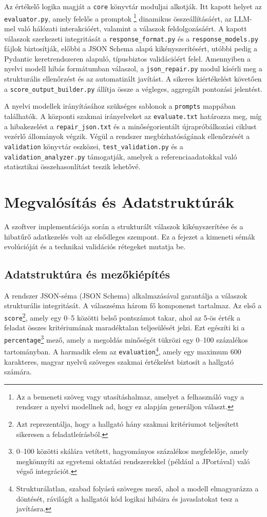 \documentclass[12pt,a4paper]{article}
\begin{document}
Az értékelő logika magját a \texttt{core} könyvtár moduljai alkotják. Itt kapott helyet az \texttt{evaluator.py}, amely felelős a promptok\footnote{Az a bemeneti szöveg vagy utasításhalmaz, amelyet a felhasználó vagy a rendszer a nyelvi modellnek ad, hogy ez alapján generáljon választ.} dinamikus összeállításáért, az LLM-mel való hálózati interakcióért, valamint a válaszok feldolgozásáért. A kapott válaszok szerkezeti integritását a \texttt{response\_format.py} és a \texttt{response\_models.py} fájlok biztosítják, előbbi a JSON Schema alapú kikényszerítésért, utóbbi pedig a Pydantic keretrendszeren alapuló, típusbiztos validációért felel. Amennyiben a nyelvi modell hibás formátumban válaszol, a \texttt{json\_repair.py} modul kísérli meg a strukturális ellenőrzést és az automatizált javítást. A sikeres kiértékelést követően a \texttt{score\_output\_builder.py} állítja össze a végleges, aggregált pontozási jelentést.

A nyelvi modellek irányításához szükséges sablonok a \texttt{prompts} mappában találhatók. A központi szakmai irányelveket az \texttt{evaluate.txt} határozza meg, míg a hibakezelést a \texttt{repair\_json.txt} és a minőségorientált újrapróbálkozási ciklust vezérlő  állományok végzik. Végül a rendszer megbízhatóságának ellenőrzését a \texttt{validation} könyvtár eszközei, \texttt{test\_validation.py} és a \texttt{validation\_analyzer.py} támogatják, amelyek a referenciaadatokkal való statisztikai összehasonlítást teszik lehetővé.

\section{Megvalósítás és Adatstruktúrák}
\label{sec:megvalositas}
A szoftver implementációja során a strukturált válaszok kikényszerítése és a hibatűrő adatkezelés volt az elsődleges szempont. Ez a fejezet a kimeneti sémák evolúcióját és a technikai validációs rétegeket mutatja be.

\subsection{Adatstruktúra és mezőkiépítés}
\label{sec:adatstruktura}
A rendszer JSON-séma (JSON Schema) alkalmazásával garantálja a válaszok strukturális integritását. A válaszséma három fő komponenst tartalmaz. Az első a \texttt{score}\footnote{Azt reprezentálja, hogy a hallgató hány szakmai kritériumot teljesített sikeresen a feladatleírásból.}, amely egy 0--5 közötti belső pontszámot takar, ahol az 5-ös érték a feladat összes kritériumának maradéktalan teljesülését jelzi. Ezt egészíti ki a \texttt{percentage}\footnote{0--100 közötti skálára vetített, hagyományos százalékos megfelelője, amely megkönnyíti az egyetemi oktatási rendszerekkel (például a JPortával) való végső integrációt.} mező, amely a megoldás minőségét tükrözi egy 0--100 százalékos tartományban. A harmadik elem az \texttt{evaluation}\footnote{Strukturálatlan, szabad folyású szöveges mező, ahol a modell elmagyarázza a döntését, rávilágít a hallgatói kód logikai hibáira és javaslatokat tesz a javításra.}, amely egy maximum 600 karakteres, magyar nyelvű szöveges szakmai értékelést biztosít a hallgató számára.
\end{document}
